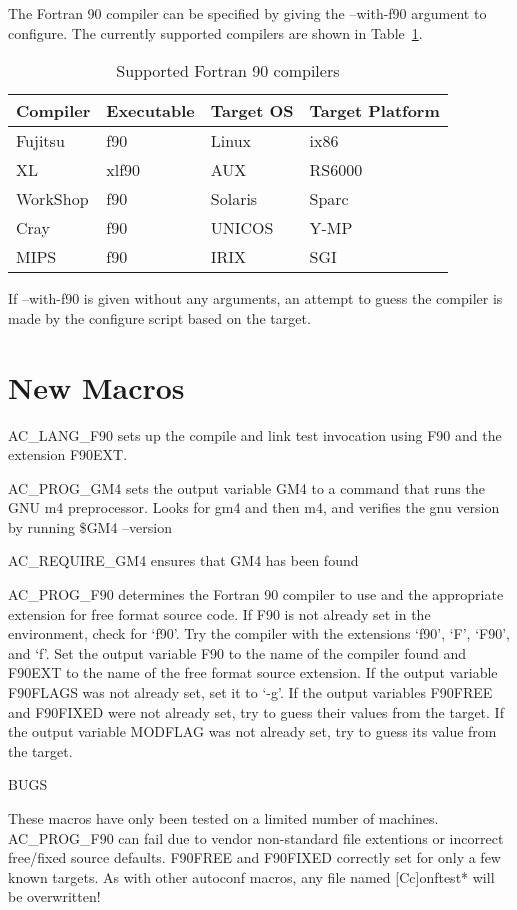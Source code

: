 \documentclass[11pt]{nmemo}
\begin{document}
The Fortran 90 compiler can be specified by giving the --with-f90
argument to configure.  The currently supported compilers are shown in
Table~\ref{tbl:compilers}.

\begin{table}[hb]
\caption{Supported Fortran 90 compilers}\label{tbl:compilers}
\begin{tabular}{l|l|l|l}
Compiler & Executable & Target OS & Target Platform \\ \hline
Fujitsu  & f90        & Linux     & ix86 \\
XL	 & xlf90      & AUX       & RS6000 \\
WorkShop & f90	      & Solaris	  & Sparc \\
Cray     & f90        & UNICOS    & Y-MP \\
MIPS     & f90        & IRIX      & SGI  
\end{tabular}
\end{table}
If --with-f90 is given without any arguments, an attempt to guess the
compiler is made by the configure script based on the target.

\section{New Macros}

AC\_LANG\_F90 sets up the compile and link test invocation using
F90 and the extension F90EXT.

AC\_PROG\_GM4 sets the output variable GM4 to a command that runs 
the GNU m4 preprocessor.  Looks for gm4 and then m4, and verifies 
the gnu version by running \${GM4} --version

AC\_REQUIRE\_GM4 ensures that GM4 has been found

AC\_PROG\_F90 determines the Fortran 90 compiler to use and the
appropriate extension for free format source code.  If F90
is not already set in the environment, check for `f90'.  Try
the compiler with the extensions `f90', `F', `F90', and `f'.
Set the output variable F90 to the name of the compiler found
and F90EXT to the name of the free format source extension.
If the output variable F90FLAGS was not already set, set it to
`-g'.  If the output variables F90FREE and F90FIXED were not
already set, try to guess their values from the target.  If
the output variable MODFLAG was not already set, try to guess
its value from the target.

BUGS

These macros have only been tested on a limited number of
machines.   AC\_PROG\_F90 can fail due to vendor non-standard
file extentions or incorrect free/fixed source defaults.
F90FREE and F90FIXED correctly set for only a few known
targets.  As with other autoconf macros, any file
named [Cc]onftest* will be overwritten!
\end{document}
